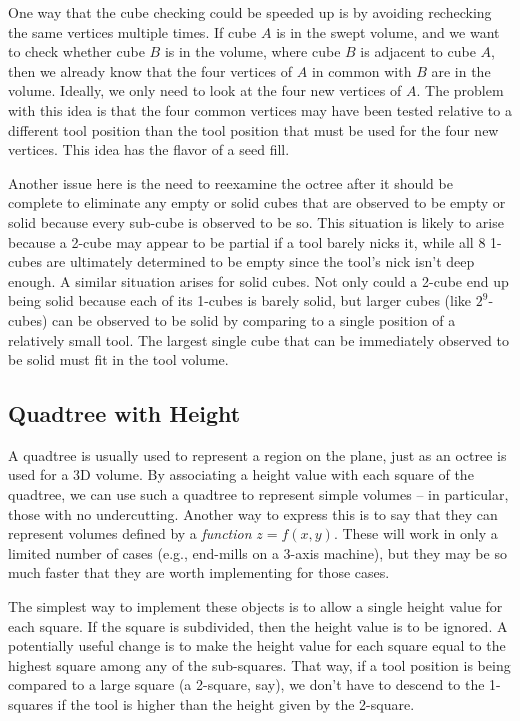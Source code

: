 \documentclass[titlepage,oneside,10pt]{article}
\begin{document}
One way that the cube checking could be speeded up is by avoiding
rechecking the same vertices multiple times. If cube $A$ is in the
swept volume, and we want to check whether cube $B$ is in the volume,
where cube $B$ is adjacent to cube $A$, then we already know that the
four vertices of $A$ in common with $B$ are in the volume. Ideally, we
only need to look at the four new vertices of $A$. The problem with
this idea is that the four common vertices may have been tested
relative to a different tool position than the tool position that must
be used for the four new vertices. This idea has the flavor of a seed
fill. 

Another issue here is the need to reexamine the octree after it should
be complete to eliminate any empty or solid cubes that are observed to
be empty or solid because every sub-cube is observed to be so. This
situation is likely to arise because a 2-cube may appear to be partial if a
tool barely nicks it, while all 8 1-cubes are ultimately determined to
be empty since the tool's nick isn't deep enough. A similar situation
arises for solid cubes. Not only could a 2-cube end up being solid
because each of its 1-cubes is barely solid, but larger cubes (like
$2^9$-cubes) can be observed to be solid by comparing to a single
position of a relatively small tool. The largest single cube that can
be immediately observed to be solid must fit in the tool volume.

\subsection{Quadtree with Height}

A quadtree is usually used to represent a region on the plane, just as
an octree is used for a 3D volume. By associating a height value with
each square of the quadtree, we can use such a quadtree to represent
simple volumes -- in particular, those with no undercutting. Another
way to express this is to say that they can represent volumes defined
by a \emph{function} $z=f(x,y)$. These will work in only a limited
number of cases (e.g., end-mills on a 3-axis machine), but they may be
so much faster that they are worth implementing for those cases.

The simplest way to implement these objects is to allow a single
height value for each square. If the square is subdivided, then the
height value is to be ignored. A potentially useful change is to make
the height value for each square equal to the highest square among any
of the sub-squares. That way, if a tool position is being compared to
a large square (a 2-square, say), we don't have to descend to the
1-squares if the tool is higher than the height given by the 2-square.
\end{document}
